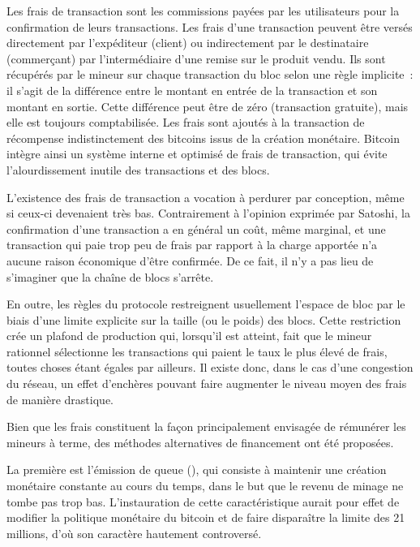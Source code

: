 Les frais de transaction sont les commissions payées par les utilisateurs pour la confirmation de leurs transactions. Les frais d'une transaction peuvent être versés directement par l'expéditeur (client) ou indirectement par le destinataire (commerçant) par l'intermédiaire d'une remise sur le produit vendu. Ils sont récupérés par le mineur sur chaque transaction du bloc selon une règle implicite~: il s'agit de la différence entre le montant en entrée de la transaction et son montant en sortie. Cette différence peut être de zéro (transaction gratuite), mais elle est toujours comptabilisée. Les frais sont ajoutés à la transaction de récompense indistinctement des bitcoins issus de la création monétaire. Bitcoin intègre ainsi un système interne et optimisé de frais de transaction, qui évite l'alourdissement inutile des transactions et des blocs.

L'existence des frais de transaction a vocation à perdurer par conception, même si ceux-ci devenaient très bas. Contrairement à l'opinion exprimée par Satoshi, la confirmation d'une transaction a en général un coût, même marginal, et une transaction qui paie trop peu de frais par rapport à la charge apportée n'a aucune raison économique d'être confirmée. De ce fait, il n'y a pas lieu de s'imaginer que la chaîne de blocs s'arrête.

En outre, les règles du protocole restreignent usuellement l'espace de bloc par le biais d'une limite explicite sur la taille (ou le poids) des blocs. Cette restriction crée un plafond de production qui, lorsqu'il est atteint, fait que le mineur rationnel sélectionne les transactions qui paient le taux le plus élevé de frais, toutes choses étant égales par ailleurs. Il existe donc, dans le cas d'une congestion du réseau, un effet d'enchères pouvant faire augmenter le niveau moyen des frais de manière drastique.


Bien que les frais constituent la façon principalement envisagée de rémunérer les mineurs à terme, des méthodes alternatives de financement ont été proposées.

La première est l'émission de queue (), qui consiste à maintenir une création monétaire constante au cours du temps, dans le but que le revenu de minage ne tombe pas trop bas. L'instauration de cette caractéristique aurait pour effet de modifier la politique monétaire du bitcoin et de faire disparaître la limite des 21 millions, d'où son caractère hautement controversé.

